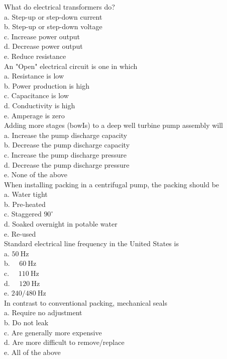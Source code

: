 What do electrical transformers do?\\
a. Step-up or step-down current\\
b. Step-up or step-down voltage\\
c. Increase power output\\
d. Decrease power output\\
e. Reduce resistance\\

An "Open" electrical circuit is one in which\\
a. Resistance is low\\
b. Power production is high\\
c. Capacitance is low\\
d. Conductivity is high\\
e. Amperage is zero\\

Adding more stages (bowIs) to a deep well turbine pump assembly will\\
a. Increase the pump discharge capacity\\
b. Decrease the pump discharge capacity\\
c. Increase the pump discharge pressure\\
d. Decrease the pump discharge pressure\\
e. None of the above\\

When installing packing in a centrifugal pump, the packing should be\\
a. Water tight\\
b. Pre-heated\\
c. Staggered $90^{\circ}$\\
d. Soaked overnight in potable water\\
e. Re-used\\

Standard electrical line frequency in the United States is\\
a. $50 \mathrm{~Hz}$\\
b. $\quad 60 \mathrm{~Hz}$\\
c. $\quad 110 \mathrm{~Hz}$\\
d. $\quad 120 \mathrm{~Hz}$\\
e. $240 / 480 \mathrm{~Hz}$\\

In contrast to conventional packing, mechanical seals\\
a. Require no adjustment\\
b. Do not leak\\
c. Are generally more expensive\\
d. Are more difficult to remove/replace\\
e. All of the above\\

